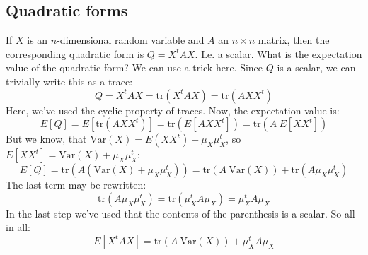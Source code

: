 \documentclass[12pt, a4paper]{article}
\numberwithin{equation}{section}
\begin{document}
\subsection{Quadratic forms}
If $X$ is an $n$-dimensional random variable and $A$ an $n\times n$ matrix, then the corresponding quadratic form is $Q=X^tAX$. I.e. a scalar. What is the expectation value of the quadratic form? We can use a trick here. Since $Q$ is a scalar, we can trivially write this as a trace:
\begin{equation}
Q=X^tAX=\textrm{tr}(X^tAX)=\textrm{tr}(AXX^t)
\end{equation}
Here, we've used the cyclic property of traces. Now, the expectation value is:
\begin{equation}
E[Q]=E[\textrm{tr}(AXX^t)]=\textrm{tr}(E[AXX^t])=\textrm{tr}(A\ E[XX^t])
\end{equation}
But we know, that $\textrm{Var}(X)=E(XX^t)-\mu_X\mu_X^t$, so $E[XX^t]=\textrm{Var}(X)+\mu_X\mu_X^t$:
\begin{equation}
E[Q]=\textrm{tr}(A(\textrm{Var}(X)+\mu_X\mu_X^t))=\textrm{tr}(A\ \textrm{Var}(X))+\textrm{tr}(A\mu_X\mu_X^t)
\end{equation}
The last term may be rewritten:
\begin{equation}
\textrm{tr}(A\mu_X\mu_X^t)=\textrm{tr}(\mu_X^t A\mu_X)=\mu_X^t A\mu_X
\end{equation}
In the last step we've used that the contents of the parenthesis is a scalar. So all in all:
\begin{equation}
E[X^tAX]=\textrm{tr}(A\ \textrm{Var}(X))+\mu_X^t A\mu_X
\end{equation}
\end{document}
